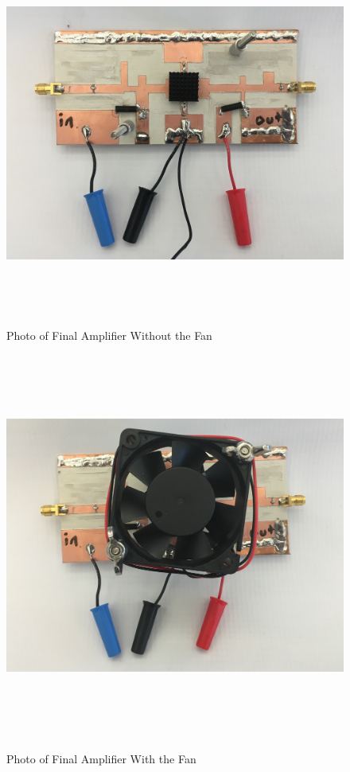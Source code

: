\begin{figure}
  \centering
  \includegraphics[width=5in,height=5in,keepaspectratio]{figures/test/final_amp}\\
  \caption{Photo of Final Amplifier Without the Fan}
  \label{fig:final_amp}

  \vspace*{\floatsep}

  \centering
  \includegraphics[width=5in,height=5in,keepaspectratio]{figures/test/final_fan}\\
  \caption{Photo of Final Amplifier With the Fan}
  \label{fig:final_fan}
\end{figure}

